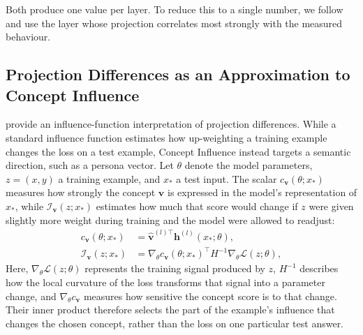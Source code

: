 Both  produce one value per layer. To reduce this to a single number, we follow \cite{chen2025persona_vectors} and use the layer whose projection correlates most strongly with the measured behaviour.

\subsection{Projection Differences as an Approximation to Concept Influence}
\label{subsec:concept_influence}

\citet{kowal2026conceptinfluenceleveraginginterpretability} provide an influence-function interpretation of projection differences. While a standard influence function estimates how up-weighting a training example changes the loss on a test example, Concept Influence instead targets a semantic direction, such as a persona vector. Let $\theta$ denote the model parameters, $z=(x,y)$ a training example, and $x_*$ a test input. The scalar $c_{\mathbf{v}}(\theta;x_*)$ measures how strongly the concept $\mathbf{v}$ is expressed in the model's representation of $x_*$, while $\mathcal{I}_{\mathbf{v}}(z;x_*)$ estimates how much that score would change if $z$ were given slightly more weight during training and the model were allowed to readjust:
\begin{equation}
    \begin{aligned}
        c_{\mathbf{v}}(\theta;x_*) &= \hat{\mathbf{v}}^{(l)\top}\mathbf{h}^{(l)}(x_*;\theta), \\
        \mathcal{I}_{\mathbf{v}}(z;x_*) &= \nabla_\theta c_{\mathbf{v}}(\theta;x_*)^\top H^{-1}\nabla_\theta \mathcal{L}(z;\theta),
    \end{aligned}
    \label{eq:concept_influence}
\end{equation}
Here, $\nabla_\theta\mathcal{L}(z;\theta)$ represents the training signal produced by $z$, $H^{-1}$ describes how the local curvature of the loss transforms that signal into a parameter change, and $\nabla_\theta c_{\mathbf{v}}$ measures how sensitive the concept score is to that change. Their inner product therefore selects the part of the example's influence that changes the chosen concept, rather than the loss on one particular test answer.

